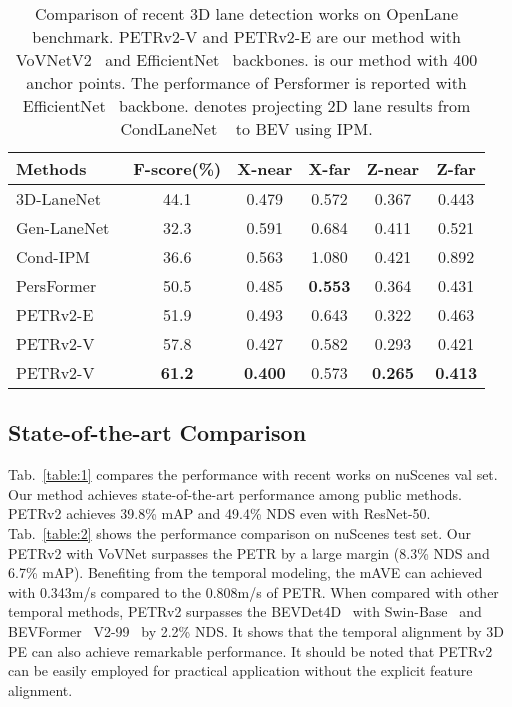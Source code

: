 \documentclass[10pt,twocolumn,letterpaper]{article}
\begin{document}
\begin{table}[t]
\begin{center}
\caption{Comparison of recent 3D lane detection works on OpenLane benchmark.
PETRv2-V and PETRv2-E are our method with VoVNetV2~\cite{lee2020centermask} and EfficientNet~\cite{tan2019efficientnet} backbones.
 is our method with 400 anchor points. The performance of Persformer is reported with EfficientNet~\cite{tan2019efficientnet} backbone.
 denotes projecting 2D lane results from CondLaneNet ~\cite{liu2021condlanenet} to BEV using IPM.}
\label{lane_compare}
\setlength{\tabcolsep}{2pt}
\begin{tabular}{l|ccccc}
\hline
Methods & F-score(\%)  & X-near & X-far & Z-near & Z-far  \\
\hline
3D-LaneNet~\cite{garnett20193d} & 44.1& 0.479 & 0.572 & 0.367 & 0.443   \\
Gen-LaneNet~\cite{guo2020gen} & 32.3 & 0.591 & 0.684 & 0.411 & 0.521 \\
Cond-IPM & 36.6 & 0.563 & 1.080 & 0.421 & 0.892 \\
PersFormer~\cite{chen2022persformer} & 50.5 & 0.485 & \textbf{0.553} & 0.364 & 0.431 \\
\hline
PETRv2-E & 51.9 & 0.493 & 0.643 & 0.322 & 0.463 \\
PETRv2-V & 57.8 & 0.427 & 0.582 & 0.293 & 0.421 \\
PETRv2-V  & \textbf{61.2} & \textbf{0.400} & 0.573 & \textbf{0.265} & \textbf{0.413} \\

\hline
\end{tabular}
\end{center}
\vspace{-1.5em}
\end{table}

\subsection{State-of-the-art Comparison}
Tab.~\ref{table:1} compares the performance with recent works on nuScenes val set. Our method achieves state-of-the-art performance among public methods. PETRv2 achieves 39.8\% mAP and 49.4\% NDS even with ResNet-50. Tab.~\ref{table:2} shows the performance comparison on nuScenes test set. Our PETRv2 with VoVNet surpasses the PETR by a large margin (8.3\% NDS and 6.7\% mAP). Benefiting from the temporal modeling, the mAVE can achieved with 0.343m/s compared to the 0.808m/s of PETR. When compared with other temporal methods, PETRv2 surpasses the BEVDet4D~\cite{huang2022bevdet4d} with Swin-Base~\cite{liu2021swin} and BEVFormer~\cite{li2022bevformer} V2-99~\cite{lee2020centermask} by 2.2\% NDS. It shows that the temporal alignment by 3D PE can also achieve remarkable performance. It should be noted that PETRv2 can be easily employed for practical application without the explicit feature alignment. 
\end{document}
